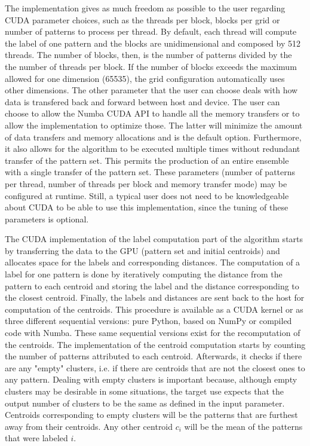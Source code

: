 The implementation gives as much freedom as possible to the user regarding CUDA parameter choices, such as the threads per block, blocks per grid or number of patterns to process per thread.
By default, each thread will compute the label of one pattern and the blocks are unidimensional and composed by 512 threads.
The number of blocks, then, is the number of patterns divided by the the number of threads per block.
If the number of blocks exceeds the maximum allowed for one dimension (65535), the grid configuration automatically uses other dimensions.
The other parameter that the user can choose deals with how data is transfered back and forward between host and device.
The user can choose to allow the Numba CUDA API to handle all the memory transfers or to allow the implementation to optimize those.
The latter will minimize the amount of data transfers and memory allocations and is the default option.
Furthermore, it also allows for the algorithm to be executed multiple times without redundant transfer of the pattern set.
This permits the production of an entire ensemble with a single transfer of the pattern set.
These parameters (number of patterns per thread, number of threads per block and memory transfer mode) may be configured at runtime.
Still, a typical user does not need to be knowledgeable about CUDA to be able to use this implementation, since the tuning of these parameters is optional.

The CUDA implementation of the label computation part of the algorithm starts by transferring the data to the GPU (pattern set and initial centroids) and allocates space for the labels and corresponding distances.
The computation of a label for one pattern is done by iteratively computing the distance from the pattern to each centroid and storing the label and the distance corresponding to the closest centroid.
Finally, the labels and distances are sent back to the host for computation of the centroids.
This procedure is available as a CUDA kernel or as three different sequential versions: pure Python, based on NumPy or compiled code with Numba.
These same sequential versions exist for the recomputation of the centroids.
The implementation of the centroid computation starts by counting the number of patterns attributed to each centroid.
Afterwards, it checks if there are any "empty" clusters, i.e. if there are centroids that are not the closest ones to any pattern.
Dealing with empty clusters is important because, although empty clusters may be desirable in some situations, the target use expects that the output number of clusters to be the same as defined in the input parameter.
Centroids corresponding to empty clusters will be the patterns that are furthest away from their centroids.
Any other centroid $c_i$ will be the mean of the patterns that were labeled $i$.


